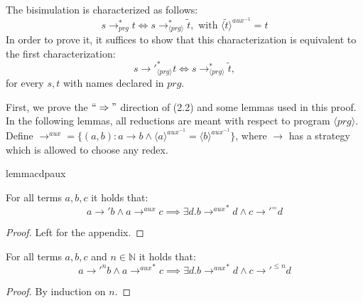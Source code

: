 The bisimulation is characterized as follows:
\[
s {\longrightarrow}_{prg}^* t \iff s \longrightarrow^*_{\langle prg \rangle} \widetilde{t}, \text{ with } \langle \widetilde{t} \rangle^{aux^{-1}} = t
\]
In order to prove it, it suffices to show that this characterization is equivalent to the first characterization:
\begin{equation}
s {\longrightarrow'}_{\langle prg \rangle}^* t \iff s \longrightarrow^*_{\langle prg \rangle} \widetilde{t},
\end{equation}
for every $s, t$ with names declared in $prg$.

First, we prove the $`` \Rightarrow "$ direction of (2.2) and some lemmas used in this proof. In the following lemmas, all reductions are meant with respect to program $\langle prg \rangle$. Define $\longrightarrow^{aux} = \{(a,b) : a \longrightarrow b \land \langle a \rangle^{aux^{-1}} = \langle b \rangle^{aux^{-1}}\}$, where $\longrightarrow$ has a strategy which is allowed to choose any redex.

\begin{restatable}{lemma}{cdpaux}

For all terms $a,b,c$ it holds that:
\[
a {\longrightarrow'} b \land a \longrightarrow^{aux} c \implies \exists d . b {\longrightarrow^{aux}}^* d \land c {\longrightarrow'}^= d
\]

\end{restatable}
\begin{proof}
Left for the appendix.
\end{proof}

\begin{corollary}

For all terms $a,b,c$ and $n \in \mathbb{N}$ it holds that:
\[
a {\longrightarrow'}^n b \land a {\longrightarrow^{aux}}^* c \implies \exists d . b {\longrightarrow^{aux}}^* d \land c {\longrightarrow'}^{\leq n} d
\]

\begin{proof}

By induction on $n$.

\end{proof}

\end{corollary}

